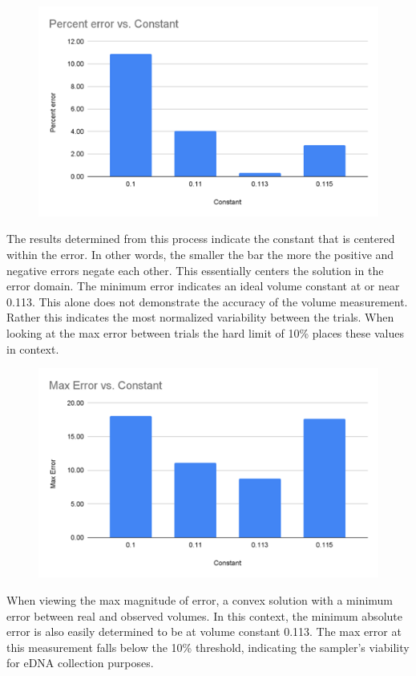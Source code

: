 \documentclass[11pt, letterpaper]{article}
\begin{document}
\begin{figure}[H]
	\centering
	\includegraphics[scale=1]{./Assets/Flow1.png}
	\caption{}
\end{figure}
\par\noindent
The results determined from this process indicate the constant that is centered within the error. In other words, the smaller the bar the more the positive and negative errors negate each other. This essentially centers the solution in the error domain. The minimum error indicates an ideal volume constant at or near 0.113. This alone does not demonstrate the accuracy of the volume measurement. Rather this indicates the most normalized variability between the trials. When looking at the max error between trials the hard limit of 10\% places these values in context.

\begin{figure}[H]
	\centering
	\includegraphics[scale=1]{./Assets/Flow2.png}
	\caption{}
\end{figure}
\par\noindent
When viewing the max magnitude of error, a convex solution with a minimum error between real and observed volumes. In this context, the minimum absolute error is also easily determined to be at volume constant 0.113. The max error at this measurement falls below the 10\% threshold, indicating the sampler’s viability for eDNA collection purposes.
\end{document}
